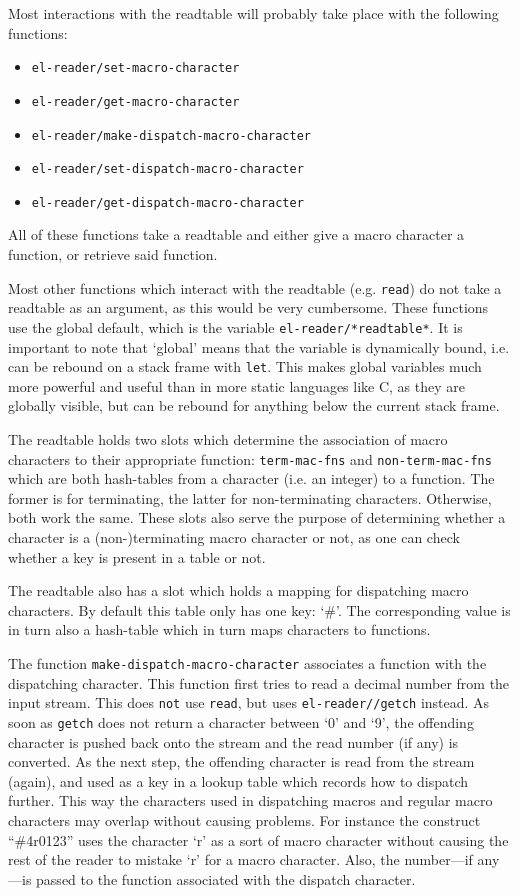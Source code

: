 \documentclass[a4paper,10pt,twoside]{report}
\newcommand{\sym}[1]{\texttt{#1}}
\newcommand{\fun}[1]{\texttt{#1}}
\newcommand{\Read}{\fun{read}}
\begin{document}
Most interactions with the readtable will probably take place with the following
functions:
\begin{itemize}
\item \fun{el-reader/set-macro-character} 
\item \fun{el-reader/get-macro-character}
\item \fun{el-reader/make-dispatch-macro-character}
\item \fun{el-reader/set-dispatch-macro-character}
\item \fun{el-reader/get-dispatch-macro-character}
\end{itemize}
All of these functions take a readtable and either give a macro character a
function, or retrieve said function.

Most other functions which interact with the readtable (e.g. \Read{}) do not
take a readtable as an argument, as this would be very cumbersome.  These
functions use the global default, which is the variable
\sym{el-reader/*readtable*}.  It is important to note that `global' means that
the variable is dynamically bound, i.e. can be rebound on a stack frame with
\fun{let}.  This makes global variables much more powerful and useful than in
more static languages like C, as they are globally visible, but can be rebound
for anything below the current stack frame.

The readtable holds two slots which determine the association of macro
characters to their appropriate function: \sym{term-mac-fns} and
\sym{non-term-mac-fns} which are both hash-tables from a character (i.e. an
integer) to a function.  The former is for terminating, the latter for
non-terminating characters.  Otherwise, both work the same.  These slots also
serve the purpose of determining whether a character is a (non-)terminating
macro character or not, as one can check whether a key is present in a table or
not.

The readtable also has a slot which holds a mapping for dispatching macro
characters.  By default this table only has one key: `\#'.  The corresponding
value is in turn also a hash-table which in turn maps characters to functions.

The function \fun{make-dispatch-macro-character} associates a function
with the dispatching character.  This function first tries to read a decimal
number from the input stream.  This does \texttt{not} use \Read{}, but uses
\fun{el-reader//getch} instead.  As soon as \fun{getch} does not return a
character between `0' and `9', the offending character is pushed back onto the
stream and the read number (if any) is converted.  As the next step, the offending
character is read from the stream (again), and used as a key in a lookup table
which records how to dispatch further.  This way the characters used in
dispatching macros and regular macro characters may overlap without causing
problems.  For instance the construct ``\#4r0123'' uses the character `r' as a
sort of macro character without causing the rest of the reader to mistake `r'
for a macro character.  Also, the number---if any---is passed to the function
associated with the dispatch character.
\end{document}
